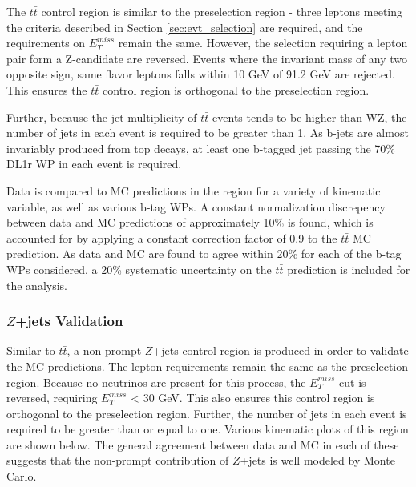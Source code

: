 The $t\bar{t}$ control region is similar to the preselection region - three leptons meeting the criteria described in Section \ref{sec:evt_selection} are required, and the requirements on $E_T^{miss}$ remain the same. However, the selection requiring a lepton pair form a Z-candidate are reversed. Events where the invariant mass of any two opposite sign, same flavor leptons falls within 10 GeV of 91.2 GeV are rejected. This ensures the $t\bar{t}$ control region is orthogonal to the preselection region. 

Further, because the jet multiplicity of $t\bar{t}$ events tends to be higher than WZ, the number of jets in each event is required to be greater than 1. As b-jets are almost invariably produced from top decays, at least one b-tagged jet passing the 70\% DL1r WP in each event is required. 

Data is compared to MC predictions in the region for a variety of kinematic variable, as well as various b-tag WPs. A constant normalization discrepency between data and MC predictions of approximately 10\% is found, which is accounted for by applying a constant correction factor of 0.9 to the $t\bar{t}$ MC prediction. As data and MC are found to agree within 20\% for each of the b-tag WPs considered, a 20\% systematic uncertainty on the $t\bar{t}$ prediction is included for the analysis.

\subsubsection{$Z$+jets Validation}

Similar to $t\bar{t}$, a non-prompt $Z$+jets control region is produced in order to validate the MC predictions. The lepton requirements remain the same as the preselection region. Because no neutrinos are present for this process, the $E_T^{miss}$ cut is reversed, requiring $E_T^{miss}$ < 30 GeV. This also ensures this control region is orthogonal to the preselection region. Further, the number of jets in each event is required to be greater than or equal to one. Various kinematic plots of this region are shown below. The general agreement between data and MC in each of these suggests that the non-prompt contribution of $Z$+jets is well modeled by Monte Carlo.

